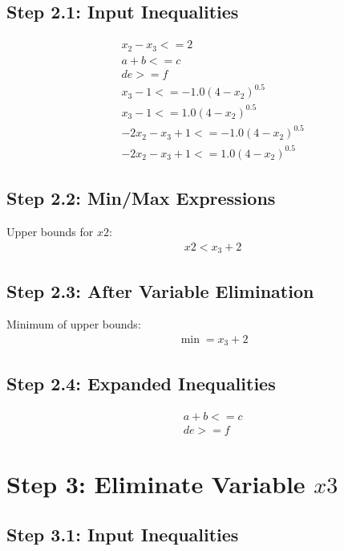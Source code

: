 \documentclass{article}
\begin{document}
\subsection{Step 2.1: Input Inequalities}

\begin{align}
& x_{2} - x_{3} <= 2 \\
& a + b <= c \\
& d e >= f \\
& x_{3} - 1 <= - 1.0 \left(4 - x_{2}\right)^{0.5} \\
& x_{3} - 1 <= 1.0 \left(4 - x_{2}\right)^{0.5} \\
& - 2 x_{2} - x_{3} + 1 <= - 1.0 \left(4 - x_{2}\right)^{0.5} \\
& - 2 x_{2} - x_{3} + 1 <= 1.0 \left(4 - x_{2}\right)^{0.5}
\end{align}

\subsection{Step 2.2: Min/Max Expressions}

Upper bounds for $x2$:
\begin{align}
& x2 < x_{3} + 2
\end{align}

\subsection{Step 2.3: After Variable Elimination}

Minimum of upper bounds:
\begin{align}
& \min = x_{3} + 2
\end{align}

\subsection{Step 2.4: Expanded Inequalities}

\begin{align}
& a + b <= c \\
& d e >= f
\end{align}

\section{Step 3: Eliminate Variable $x3$}

\subsection{Step 3.1: Input Inequalities}
\end{document}
